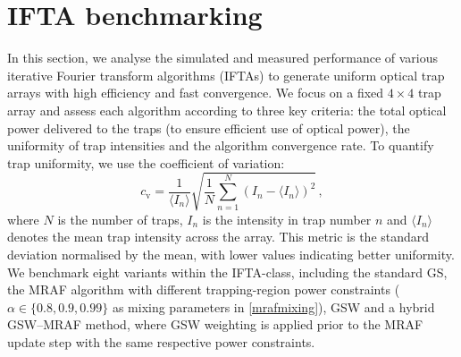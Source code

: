 \documentclass[../Thesis-IJspeert.tex]{subfiles}
\begin{document}
\section{IFTA benchmarking}
In this section, we analyse the simulated and measured performance of various iterative Fourier transform algorithms (IFTAs) to generate uniform optical trap arrays with high efficiency and fast convergence. We focus on a fixed $4 \times 4$ trap array and assess each algorithm according to three key criteria: the total optical power delivered to the traps (to ensure efficient use of optical power), the uniformity of trap intensities and the algorithm convergence rate. To quantify trap uniformity, we use the coefficient of variation:
\begin{equation}
\label{coeffofvariation}
c_\mathrm{v} = \frac{1}{\langle I_n \rangle} \sqrt{ \frac{1}{N} \sum_{n=1}^{N} \left( I_n - \langle I_n \rangle \right)^2 }\,,
\end{equation}
where $N$ is the number of traps, $I_n$ is the intensity in trap number $n$ and $\langle I_n \rangle$ denotes the mean trap intensity across the array. This metric is the standard deviation normalised by the mean, with lower values indicating better uniformity. We benchmark eight variants within the IFTA-class, including the standard GS, the MRAF algorithm with different trapping-region power constraints ($\alpha\in\{ 0.8,0.9,0.99\}$ as mixing parameters in \autoref{mrafmixing}), GSW and a hybrid GSW--MRAF method, where GSW weighting is applied prior to the MRAF update step with the same respective power constraints.
\end{document}
